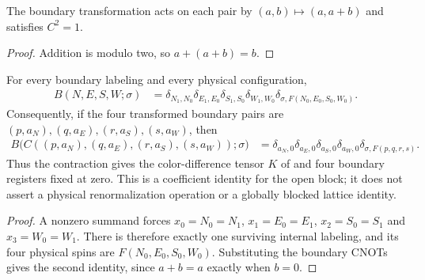 \begin{lemma}%
    \label{lem:peps_kitaev_checkerboard_cnot}
    \leanok
    The boundary transformation acts on each pair by $(a,b)\mapsto(a,a+b)$
    and satisfies $C^2=1$.
\end{lemma}

\begin{proof}\leanok
    Addition is modulo two, so $a+(a+b)=b$.
\end{proof}

\begin{lemma}%
    \label{thm:peps_kitaev_checkerboard_blocking}
    \leanok
    For every boundary labeling and every physical configuration,
    \begin{align}
        B(N,E,S,W;\sigma)
         & =\delta_{N_1,N_0}\delta_{E_1,E_0}
        \delta_{S_1,S_0}\delta_{W_1,W_0}
        \delta_{\sigma,F(N_0,E_0,S_0,W_0)}.
    \end{align}
    Consequently, if the four transformed boundary pairs are
    $(p,a_N),(q,a_E),(r,a_S),(s,a_W)$, then
    \begin{align}
        B\bigl(C((p,a_N),(q,a_E),(r,a_S),(s,a_W));\sigma\bigr)
         & =\delta_{a_N,0}\delta_{a_E,0}\delta_{a_S,0}\delta_{a_W,0}
        \delta_{\sigma,F(p,q,r,s)}.
    \end{align}
    Thus the contraction gives the color-difference tensor
    $K$ of \cite[Section~7, ``Kitaev's code state'']{Schuch2010PEPS}
    and four boundary registers fixed at zero. This is a coefficient
    identity for the open block; it does not assert a physical
    renormalization operation or a globally blocked lattice identity.
\end{lemma}

\begin{proof}\leanok
    A nonzero summand forces
    $x_0=N_0=N_1$, $x_1=E_0=E_1$, $x_2=S_0=S_1$ and $x_3=W_0=W_1$.
    There is therefore exactly one surviving internal labeling, and its
    four physical spins are $F(N_0,E_0,S_0,W_0)$. Substituting the boundary
    CNOTs gives the second identity, since $a+b=a$ exactly when $b=0$.
\end{proof}

